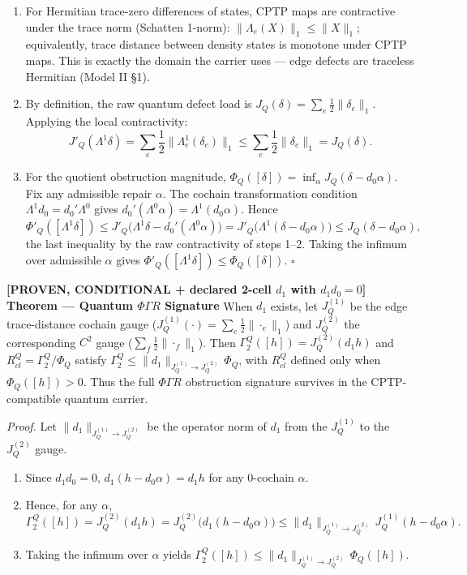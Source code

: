 \documentclass[
  11pt,
]{article}
\providecommand{\tightlist}{%
  \setlength{\itemsep}{0pt}\setlength{\parskip}{0pt}}
\providecommand{\tightlist}{%
  \setlength{\itemsep}{0pt}\setlength{\parskip}{0pt}}
\renewenvironment{quote}
  {\begin{leftbar}\small}
  {\end{leftbar}}
\begin{document}
\begin{quote}
\begin{enumerate}
\def\labelenumi{\arabic{enumi}.}
\item
  For Hermitian trace-zero differences of states, CPTP maps are contractive under the trace norm (Schatten 1-norm): \(\|\Lambda_e(X)\|_1 \le \|X\|_1\); equivalently, trace distance between density states is monotone under CPTP maps. This is exactly the domain the carrier uses --- edge defects are traceless Hermitian (Model II §1).
\item
  By definition, the raw quantum defect load is \(J_Q(\delta) = \sum_e \frac{1}{2} \|\delta_e\|_1\). Applying the local contractivity:
  \[J'_Q(\Lambda^1\delta) = \sum_e \frac{1}{2} \|\Lambda^1_e(\delta_e)\|_1 \le \sum_e \frac{1}{2} \|\delta_e\|_1 = J_Q(\delta).\]
\item
  For the quotient obstruction magnitude, \(\Phi_Q([\delta]) = \inf_{\alpha} J_Q(\delta - d_0 \alpha)\). Fix any admissible repair \(\alpha\). The cochain transformation condition \(\Lambda^1 d_0 = d_0' \Lambda^0\) gives \(d_0'(\Lambda^0\alpha)=\Lambda^1(d_0\alpha)\). Hence
  \[\Phi'_Q([\Lambda^1\delta]) \le J'_Q\big(\Lambda^1\delta - d_0'(\Lambda^0\alpha)\big) = J'_Q\big(\Lambda^1(\delta-d_0\alpha)\big) \le J_Q(\delta-d_0\alpha),\]
  the last inequality by the raw contractivity of steps 1--2. Taking the infimum over admissible \(\alpha\) gives \(\Phi'_Q([\Lambda^1\delta]) \le \Phi_Q([\delta])\). \(\square\)
\end{enumerate}

\textbf{{[}PROVEN, CONDITIONAL + declared 2-cell \(d_1\) with \(d_1d_0=0\){]} Theorem --- Quantum \(\Phi\Gamma R\) Signature}
When \(d_1\) exists, let \(J_Q^{(1)}\) be the edge trace-distance cochain gauge (\(J_Q^{(1)}(\cdot)=\sum_e\tfrac12\|\cdot_e\|_1\)) and \(J_Q^{(2)}\) the corresponding \(C^2\) gauge (\(\sum_f\tfrac12\|\cdot_f\|_1\)). Then \(\Gamma_2^Q([h]) = J_Q^{(2)}(d_1 h)\) and \(R_{cl}^Q = \Gamma_2^Q / \Phi_Q\) satisfy \(\Gamma_2^Q \le \|d_1\|_{J_Q^{(1)}\to J_Q^{(2)}}\, \Phi_Q\), with \(R_{cl}^Q\) defined only when \(\Phi_Q([h])>0\). Thus the full \(\Phi\Gamma R\) obstruction signature survives in the CPTP-compatible quantum carrier.

\emph{Proof.} Let \(\|d_1\|_{J_Q^{(1)}\to J_Q^{(2)}}\) be the operator norm of \(d_1\) from the \(J_Q^{(1)}\) to the \(J_Q^{(2)}\) gauge.

\begin{enumerate}
\def\labelenumi{\arabic{enumi}.}
\tightlist
\item
  Since \(d_1 d_0 = 0\), \(d_1(h - d_0 \alpha) = d_1 h\) for any 0-cochain \(\alpha\).
\item
  Hence, for any \(\alpha\),
  \[\Gamma_2^Q([h]) = J_Q^{(2)}(d_1 h) = J_Q^{(2)}\big(d_1(h - d_0 \alpha)\big) \le \|d_1\|_{J_Q^{(1)}\to J_Q^{(2)}}\, J_Q^{(1)}(h - d_0 \alpha).\]
\item
  Taking the infimum over \(\alpha\) yields \(\Gamma_2^Q([h]) \le \|d_1\|_{J_Q^{(1)}\to J_Q^{(2)}}\, \Phi_Q([h])\).
\end{enumerate}


\end{quote}
\end{document}

